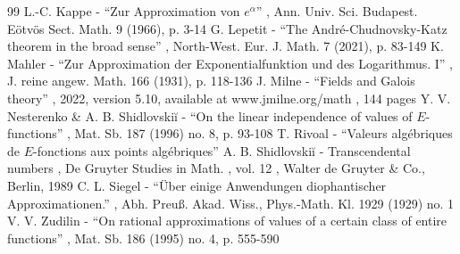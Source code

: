 \documentclass[11pt]{article}
\numberwithin{equation}{section}
\theoremstyle{definition}
\begin{document}
\begin{thebibliography}{99}
 L.-C. Kappe - “Zur Approximation von $e^{\alpha }$” , Ann. Univ. Sci. Budapest. Eötvös Sect. Math. 9 (1966), p. 3-14
 G. Lepetit - “The André-Chudnovsky-Katz theorem in the broad sense” , North-West. Eur. J. Math. 7 (2021), p. 83-149
 K. Mahler - “Zur Approximation der Exponentialfunktion und des Logarithmus. I” , J. reine angew. Math. 166 (1931), p. 118-136
 J. Milne - “Fields and Galois theory” , 2022, version 5.10, available at www.jmilne.org/math , 144 pages
 Y. V. Nesterenko \& A. B. Shidlovskiĭ - “On the linear independence of values of $E$-functions” , Mat. Sb. 187 (1996) no. 8, p. 93-108
 T. Rivoal - “Valeurs algébriques de $E$-fonctions aux points algébriques”
 A. B. Shidlovskiĭ - Transcendental numbers , De Gruyter Studies in Math. , vol. 12 , Walter de Gruyter \& Co., Berlin, 1989
 C. L. Siegel - “Über einige Anwendungen diophantischer Approximationen.” , Abh. Preuß. Akad. Wiss., Phys.-Math. Kl. 1929 (1929) no. 1
 V. V. Zudilin - “On rational approximations of values of a certain class of entire functions” , Mat. Sb. 186 (1995) no. 4, p. 555-590
\end{thebibliography}
\end{document}
